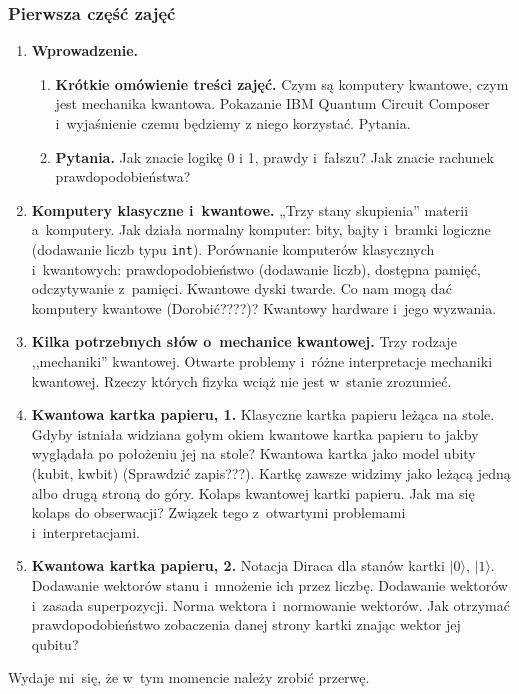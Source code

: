 \documentclass[10pt,t]{beamer}
\begin{document}
\begin{frame}
  \frametitle{Pierwsza część zajęć}


  \begin{enumerate}
    \RaggedRight

  \item \textbf{Wprowadzenie.}

    \begin{enumerate}
      \RaggedRight

    \item \textbf{Krótkie omówienie treści zajęć.} Czym są komputery
      kwantowe, czym jest mechanika kwantowa. Pokazanie IBM Quantum
      Circuit Composer i~wyjaśnienie czemu będziemy z niego korzystać.
      Pytania.

    \item \textbf{Pytania.} Jak znacie logikę 0 i 1, prawdy i~fałszu?
      Jak znacie rachunek prawdopodobieństwa?

    \end{enumerate}

  \item \textbf{Komputery klasyczne i~kwantowe.} „Trzy stany
    skupienia” materii a~komputery. Jak działa normalny komputer: bity,
    bajty i~bramki logiczne (dodawanie liczb typu \texttt{int}).
    Porównanie komputerów klasycznych i~kwantowych: prawdopodobieństwo
    (dodawanie liczb), dostępna pamięć, odczytywanie z~pamięci. Kwantowe
    dyski twarde. Co nam mogą dać komputery kwantowe (Dorobić????)?
    Kwantowy hardware i~jego wyzwania.

  \item \textbf{Kilka potrzebnych słów o~mechanice kwantowej.} Trzy
    rodzaje ,,mechaniki'' kwantowej. Otwarte problemy i~różne
    interpretacje mechaniki kwantowej. Rzeczy których fizyka wciąż nie
    jest w~stanie zrozumieć.

  \item \textbf{Kwantowa kartka papieru, 1.} Klasyczne kartka papieru
    leżąca na stole. Gdyby istniała widziana gołym okiem kwantowe kartka
    papieru to jakby wyglądała po położeniu jej na stole? Kwantowa
    kartka jako model ubity (kubit, kwbit) (Sprawdzić zapis???). Kartkę
    zawsze widzimy jako leżącą jedną albo drugą stroną do góry. Kolaps
    kwantowej kartki papieru. Jak ma się kolaps do obserwacji? Związek
    tego z~otwartymi problemami i~interpretacjami.

  \item \textbf{Kwantowa kartka papieru, 2.} Notacja Diraca dla stanów
    kartki $| 0 \rangle$, $| 1 \rangle$. Dodawanie wektorów stanu i~mnożenie ich
    przez liczbę. Dodawanie wektorów i~zasada superpozycji. Norma
    wektora i~normowanie wektorów. Jak otrzymać prawdopodobieństwo
    zobaczenia danej strony kartki znając wektor jej qubitu?

  \end{enumerate}

  Wydaje mi~się, że w~tym momencie należy zrobić przerwę.

\end{frame}
\end{document}

